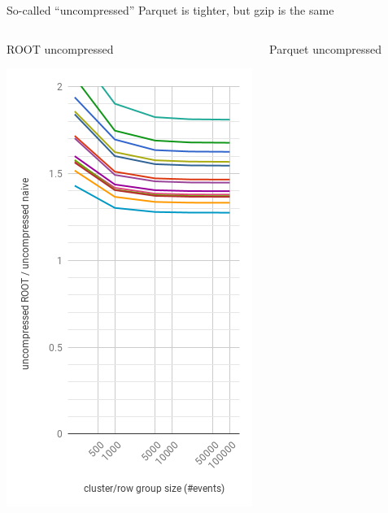 \documentclass[aspectratio=169]{beamer}
\begin{document}
\begin{frame}{So-called ``uncompressed'' Parquet is tighter, but gzip is the same}
\vspace{-0.1 cm}
\begin{columns}
\begin{center}
ROOT uncompressed

\includegraphics[width=\linewidth]{root-none.png}
\end{center}
\begin{center}
Parquet uncompressed


\end{center}
\end{columns}
\end{frame}
\end{document}
